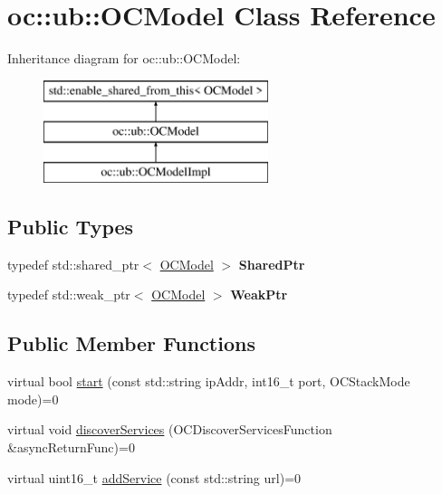 \hypertarget{classoc_1_1ub_1_1OCModel}{}\section{oc\+:\+:ub\+:\+:O\+C\+Model Class Reference}
\label{classoc_1_1ub_1_1OCModel}
Inheritance diagram for oc\+:\+:ub\+:\+:O\+C\+Model\+:\begin{figure}[H]
\begin{center}
\leavevmode
\includegraphics[height=3.000000cm]{classoc_1_1ub_1_1OCModel}
\end{center}
\end{figure}
\subsection*{Public Types}
\begin{DoxyCompactItemize}
\item 
\hypertarget{classoc_1_1ub_1_1OCModel_a41a06fcd1b57bb031e7348e9f40681b1}{}typedef std\+::shared\+\_\+ptr$<$ \hyperlink{classoc_1_1ub_1_1OCModel}{O\+C\+Model} $>$ {\bfseries Shared\+Ptr}\label{classoc_1_1ub_1_1OCModel_a41a06fcd1b57bb031e7348e9f40681b1}

\item 
\hypertarget{classoc_1_1ub_1_1OCModel_ace13bbe5a684c5b01a294912fa656e5d}{}typedef std\+::weak\+\_\+ptr$<$ \hyperlink{classoc_1_1ub_1_1OCModel}{O\+C\+Model} $>$ {\bfseries Weak\+Ptr}\label{classoc_1_1ub_1_1OCModel_ace13bbe5a684c5b01a294912fa656e5d}

\end{DoxyCompactItemize}
\subsection*{Public Member Functions}
\begin{DoxyCompactItemize}
\item 
virtual bool \hyperlink{classoc_1_1ub_1_1OCModel_ae9c3633d98ea85798de3c35f87a1e09c}{start} (const std\+::string ip\+Addr, int16\+\_\+t port, O\+C\+Stack\+Mode mode)=0
\item 
virtual void \hyperlink{classoc_1_1ub_1_1OCModel_a415bb23e3d0cb7c0ff08166d46fd660b}{discover\+Services} (O\+C\+Discover\+Services\+Function \&async\+Return\+Func)=0
\item 
virtual uint16\+\_\+t \hyperlink{classoc_1_1ub_1_1OCModel_aa11c34b45df6a00aad454cb23a72ec6f}{add\+Service} (const std\+::string url)=0
\end{DoxyCompactItemize}
